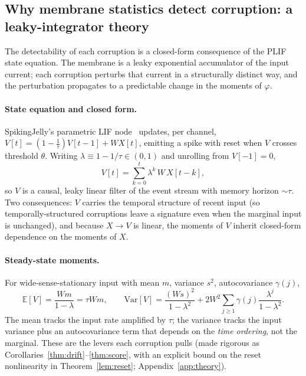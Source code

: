 ﻿\documentclass{article} %
\theoremstyle{remark}
\begin{document}
\subsection{Why membrane statistics detect corruption: a leaky-integrator theory}
\label{sec:theory}

The detectability of each corruption is a closed-form consequence of the PLIF
state equation. The membrane is a leaky exponential accumulator of
the input current; each corruption perturbs that current in a structurally distinct way, and
the perturbation propagates to a predictable change in the moments of $\varphi$.

\paragraph{State equation and closed form.}
SpikingJelly's parametric LIF node~\citep{fang2021plif} updates, per channel,
$V[t]=(1-\tfrac1\tau)V[t-1]+W X[t]$, emitting a spike with reset when $V$ crosses threshold
$\theta$. Writing $\lambda\equiv1-1/\tau\in(0,1)$ and unrolling from $V[-1]=0$,
%
\begin{equation}
  V[t]=\sum_{k=0}^{t}\lambda^{k}\,W\,X[t-k],
  \label{eq:unroll}
\end{equation}
%
so $V$ is a causal, leaky linear filter of the event stream with memory horizon $\sim\tau$.
Two consequences: $V$ carries the temporal structure of recent input (so temporally-structured
corruptions leave a signature even when the marginal input is unchanged), and because $X\!\to\!V$
is linear, the moments of $V$ inherit closed-form dependence on the moments of $X$.

\paragraph{Steady-state moments.}
For wide-sense-stationary input with mean $m$, variance $s^2$, autocovariance $\gamma(j)$,
%
\begin{equation}
  \mathbb{E}[V]=\frac{Wm}{1-\lambda}=\tau Wm,\qquad
  \mathrm{Var}[V]=\frac{(Ws)^2}{1-\lambda^2}+2W^2\!\sum_{j\ge1}\gamma(j)\frac{\lambda^{j}}{1-\lambda^2}.
  \label{eq:moments}
\end{equation}
%
The mean tracks the input rate amplified by $\tau$; the variance tracks the input variance plus
an autocovariance term that depends on the \emph{time ordering}, not the marginal. These are the
levers each corruption pulls (made rigorous as Corollaries~\ref{thm:drift}--\ref{thm:score}, with
an explicit bound on the reset nonlinearity in Theorem~\ref{lem:reset}; Appendix~\ref{app:theory}).
\end{document}
